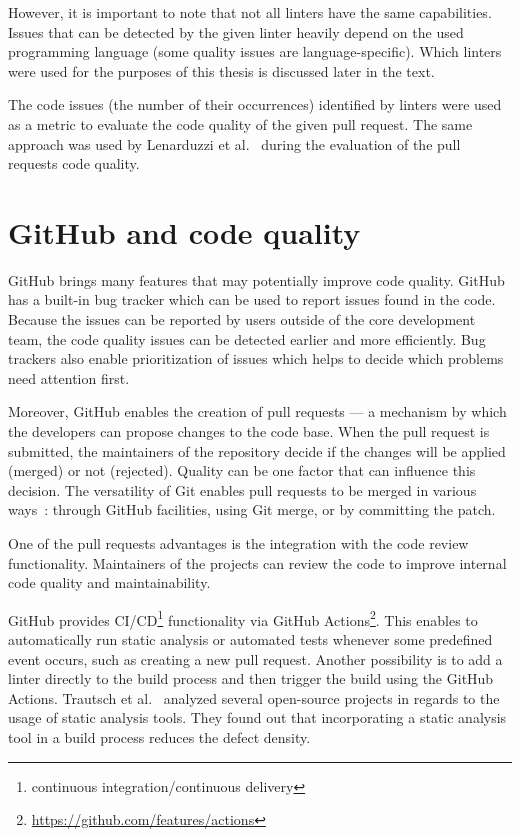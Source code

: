 \documentclass[digital,oneside,oldtable,nolof,nolot,nocover]{fithesis4}
\begin{document}
However, it is important to note that not all linters have the same
capabilities. Issues that can be detected by the given linter heavily
depend on the used programming language (some quality issues are
language-specific). Which linters were used for the purposes of this thesis
is discussed later in the text.

The code issues (the number of their occurrences) identified by linters were
used as a metric to evaluate the code quality of the given pull request.  The
same approach was used by Lenarduzzi et al.~\cite{quality} during the evaluation
of the pull requests code quality.
\section{GitHub and code quality}
\label{sec:org613503d}
GitHub brings many features that may potentially improve code quality.
GitHub has a built-in bug tracker which can be used to report issues found in the code.
Because the issues can be reported by users outside of the core development team,
the code quality issues can be detected earlier and more efficiently. Bug trackers
also enable prioritization of issues which helps to decide which problems need attention first.

Moreover, GitHub enables the creation of pull requests --- a mechanism by which the developers can propose changes to
the code base. When the pull request is submitted, the maintainers of the repository decide if the changes
will be applied (merged) or not (rejected). Quality can be one factor that can influence this decision.
The versatility of Git enables pull requests to be merged in various ways~\cite{exploratory}: through GitHub facilities,
using Git merge, or by committing the patch.

One of the pull requests advantages is the integration with the code review functionality. Maintainers of the projects
can review the code to improve internal code quality and maintainability.

GitHub provides CI/CD\footnote{continuous integration/continuous delivery}
functionality via GitHub Actions\footnote{\url{https://github.com/features/actions}}.
This enables to automatically run static analysis or automated tests whenever
some predefined event occurs, such as creating a new pull request.  Another
possibility is to add a linter directly to the build process and then trigger
the build using the GitHub Actions.  Trautsch et al.~\cite{pmd} analyzed several
open-source projects in regards to the usage of static analysis tools.  They
found out that incorporating a static analysis tool in a build process
reduces the defect density.
\end{document}
